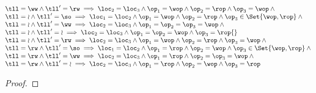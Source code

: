 \begin{lem}
\[\begin{array}{@{}l@{}}
            \tll = \ww \land \tll' = \rw \implies \loc_{2} = \loc_{3} \land \op_{1} = \wop \land \op_{2} = \rop \land \op_{3} = \wop \land {} \\
            \tll = \wr \land \tll' = \so \implies \loc_{1} = \loc_{2} \land \op_{1} = \wop \land \op_{2} = \rop \land \op_{3} \in \Set{\wop, \rop} \land {} \\
            \tll = \wr \land \tll' = \ww \implies \loc_{2} = \loc_{3} \land \op_{1} = \op_{2} = \op_{3} = \wop \land {} \\
            \tll = \wr \land \tll' = \wr \implies \loc_{2} = \loc_{3} \land \op_{1} = \op_{2} = \wop \land \op_{3} = \rop {} \\
            \tll = \wr \land \tll' = \rw \implies \loc_{2} = \loc_{3} \land \op_{1} = \wop \land \op_{2} = \rop \land \op_{3} = \wop \land {} \\
            \tll = \rw \land \tll' = \so \implies \loc_{1} = \loc_{2} \land \op_{1} = \rop \land \op_{2} = \wop \land \op_{3} \in \Set{\wop, \rop} \land {} \\
            \tll = \rw \land \tll' = \ww \implies \loc_{2} = \loc_{3} \land \op_{1} = \rop \land \op_{2} = \op_{3} = \wop \land {} \\
            \tll = \rw \land \tll' = \wr \implies \loc_{2} = \loc_{3} \land \op_{1} = \rop \land \op_{2} = \wop \land \op_{3} = \rop 
        \end{array}
    \]
\end{lem}
\begin{proof}

\end{proof}




     
